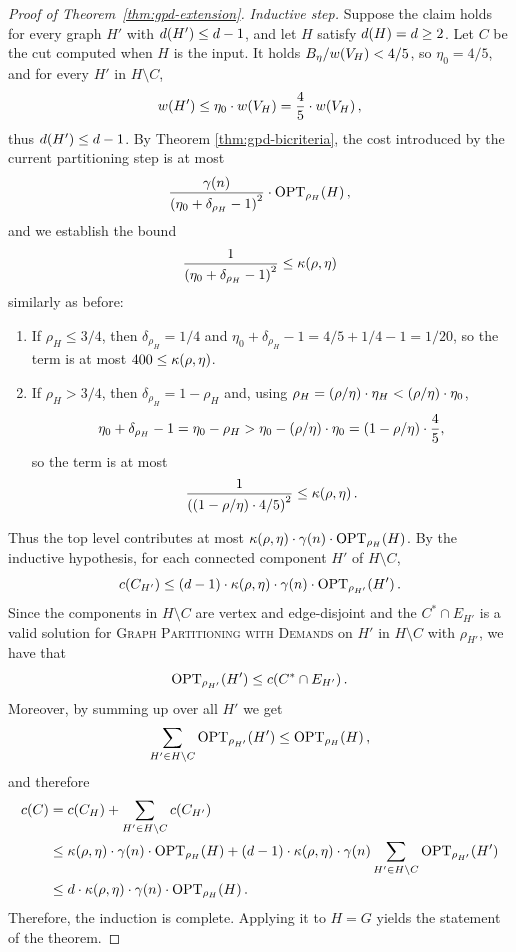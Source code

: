 \begin{proof}[Proof of Theorem~\ref{thm:gpd-extension}]
    \emph{Inductive step.} Suppose the claim holds for every graph $H'$ with $d\br{H'}\leq d-1$, and let $H$ satisfy $d\br{H}=d\geq 2$. Let $C$ be the cut computed when $H$ is the input. It holds $B_\eta/w\br{V_H}<4/5$, so $\eta_0=4/5$, and for every $H'$ in $H\setminus C$, 
    \[
    w\br{H'}\leq \eta_0\cdot w\br{V_H}=\frac{4}{5}\cdot w\br{V_H},\]
    thus $d\br{H'}\leq d-1$. By Theorem \ref{thm:gpd-bicriteria}, the cost introduced by the current partitioning step is at most 
    \[\frac{\gamma\br{n}}{\br{\eta_0+\delta_{\rho_H}-1}^2}\cdot\OPTdem{H}{\rho_H},
    \]
     and we establish the bound 
    \[\frac{1}{\br{\eta_0+\delta_{\rho_H}-1}^2}\leq \kappa\br{\rho,\eta}\] similarly as before:
    \begin{enumerate}
        \item If $\rho_H\leq 3/4$, then $\delta_{\rho_H}=1/4$ and $\eta_0+\delta_{\rho_H}-1=4/5+1/4-1=1/20$, so the term is at most $400\leq \kappa\br{\rho,\eta}$.
        \item If $\rho_H> 3/4$, then $\delta_{\rho_H}=1-\rho_H$ and, using $\rho_H=\br{\rho/\eta}\cdot\eta_H<\br{\rho/\eta}\cdot\eta_0$,
        \[
            \eta_0+\delta_{\rho_H}-1=\eta_0-\rho_H> \eta_0-\br{\rho/\eta}\cdot\eta_0=\br{1-\rho/\eta}\cdot\frac{4}{5},
        \]
        so the term is at most 
        \[
        \frac{1}{\br{\br{1-\rho/\eta}\cdot 4/5}^2}\leq \kappa\br{\rho,\eta}.
        \]
    \end{enumerate}
    Thus the top level contributes at most $\kappa\br{\rho,\eta}\cdot\gamma\br{n}\cdot\OPTdem{H}{\rho_H}$. By the inductive hypothesis, for each connected component $H'$ of $H\setminus C$, 
    \[c\br{C_{H'}}\leq \br{d-1}\cdot \kappa\br{\rho,\eta}\cdot\gamma\br{n}\cdot\OPTdem{H'}{\rho_{H'}}.\] 
    Since the components in $H\setminus C$ are vertex and edge-disjoint and the $C^*\cap E_{H'}$ is a valid solution for \textsc{Graph Partitioning with Demands} on $H'$ in $H\setminus C$ with $\rho_{H'}$, we have that 
    \[\OPTdem{H'}{\rho_{H'}}\leq c\br{C^*\cap E_{H'}}.
    \]
    Moreover, by summing up over all $H'$ we get
    \[
    \sum_{H'\in H\setminus C}\OPTdem{H'}{\rho_{H'}}\leq \OPTdem{H}{\rho_H},
    \]
    and therefore
    \begin{align*}
        c\br{C}&=c\br{C_H}+\sum_{H'\in H\setminus C}c\br{C_{H'}}
        \\&\leq \kappa\br{\rho,\eta}\cdot\gamma\br{n}\cdot\OPTdem{H}{\rho_H}+\br{d-1}\cdot\kappa\br{\rho,\eta}\cdot \gamma\br{n}\sum_{H'\in H\setminus C}\OPTdem{H'}{\rho_{H'}}
        \\&\leq 
        d\cdot \kappa\br{\rho,\eta}\cdot\gamma\br{n}\cdot\OPTdem{H}{\rho_H}.
    \end{align*}
    Therefore, the induction is complete. Applying it to $H=G$ yields the statement of the theorem.
\end{proof}

